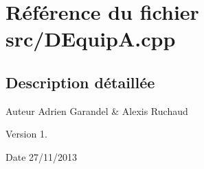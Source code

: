 \section{Référence du fichier src/\-D\-Equip\-A.cpp}
\label{_d_equip_a_8cpp}


\subsection{Description détaillée}
\begin{DoxyAuthor}{Auteur}
Adrien Garandel \& Alexis Ruchaud 
\end{DoxyAuthor}
\begin{DoxyVersion}{Version}
1. 
\end{DoxyVersion}
\begin{DoxyDate}{Date}
27/11/2013 
\end{DoxyDate}
